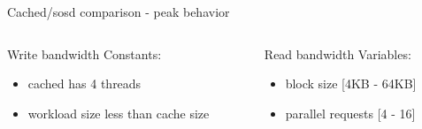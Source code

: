 \begin{frame}{Cached/sosd comparison - peak behavior}
	\begin{columns}[t]
		\begin{column}{.5\textwidth}
			Write bandwidth
			Constants:
			\begin{itemize}
				\item cached has 4 threads
				\item workload size less than cache size
			\end{itemize}
		\end{column}
		\begin{column}{.5\textwidth}
			Read bandwidth
			Variables:
			\begin{itemize}
				\item block size [4KB - 64KB]
				\item parallel requests [4 - 16]
			\end{itemize}
		\end{column}
	\end{columns}


\end{frame}
